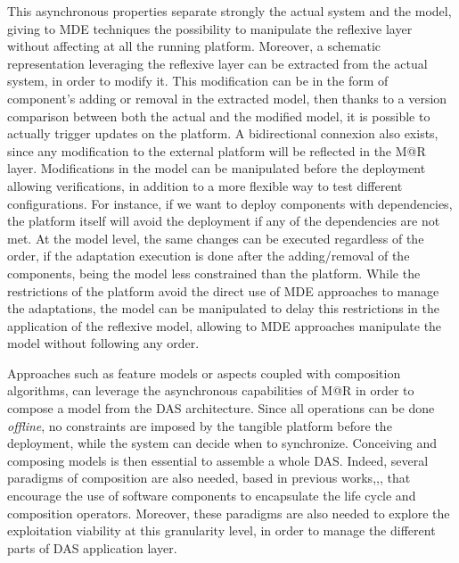 This asynchronous properties separate strongly the actual system and the model, giving to MDE techniques the possibility to manipulate the reflexive layer without affecting at all the running platform.
Moreover, a schematic representation leveraging the reflexive layer can be extracted from the actual system, in order to modify it.
This modification can be in the form of component's adding or removal in the extracted model, then thanks to a version comparison between both the actual and the modified model, it is possible to actually trigger updates on the platform.
A bidirectional connexion also exists, since any modification to the external platform will be reflected in the M@R layer.
Modifications in the model can be manipulated before the deployment allowing verifications, in addition to a more flexible way to test different configurations.
For instance, if we want to deploy components with dependencies, the platform itself will avoid the deployment if any of the dependencies are not met.
At the model level, the same changes can be executed regardless of the order, if the adaptation execution is done after the adding/removal of the components, being the model less constrained than the platform.
While the restrictions of the platform avoid the direct use of MDE approaches to manage the adaptations, the model can be manipulated to delay this restrictions in the application of the reflexive model, allowing to MDE approaches manipulate the model without following any order.

Approaches such as feature models or aspects\cite{morin2009taming} coupled with composition algorithms, can leverage the asynchronous capabilities of M@R in order to compose a model from the DAS architecture.
Since all operations can be done \textit{offline}, no constraints are imposed by the tangible platform before the deployment, while the system can decide when to synchronize.
Conceiving and composing models is then essential to assemble a whole DAS.
Indeed, several paradigms of composition are also needed, based in previous works\cite{morin2009mar},\cite{ko2012low},\cite{rouvoy2009music}, that encourage the use of software components to encapsulate the life cycle and composition operators.
Moreover, these paradigms are also needed to explore the exploitation viability at this granularity level, in order to manage the different parts of DAS application layer. 


